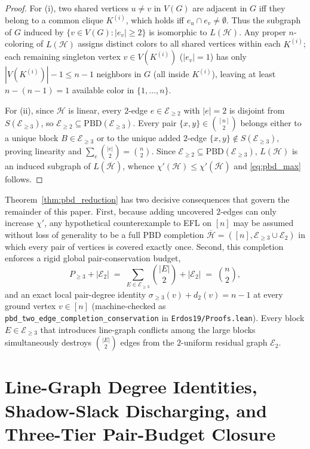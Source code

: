\documentclass[11pt,reqno]{amsart}
\theoremstyle{definition}
\theoremstyle{remark}
\begin{document}
\begin{proof}
For (i), two shared vertices $u \ne v$ in $V(G)$ are adjacent in $G$ iff they belong to a common clique $K^{(i)}$, which holds iff $e_u \cap e_v \ne \emptyset$. Thus the subgraph of $G$ induced by $\{v \in V(G) : |e_v| \ge 2\}$ is isomorphic to $L(\mathcal{H})$. Any proper $n$-coloring of $L(\mathcal{H})$ assigns distinct colors to all shared vertices within each $K^{(i)}$; each remaining singleton vertex $v \in V(K^{(i)})$ ($|e_v| = 1$) has only $|V(K^{(i)})| - 1 \le n - 1$ neighbors in $G$ (all inside $K^{(i)}$), leaving at least $n - (n - 1) = 1$ available color in $\{1, \dots, n\}$.

For (ii), since $\mathcal{H}$ is linear, every $2$-edge $e \in \mathcal{E}_{\ge 2}$ with $|e| = 2$ is disjoint from $S(\mathcal{E}_{\ge 3})$, so $\mathcal{E}_{\ge 2} \subseteq \mathrm{PBD}(\mathcal{E}_{\ge 3})$. Every pair $\{x, y\} \in \binom{[n]}{2}$ belongs either to a unique block $B \in \mathcal{E}_{\ge 3}$ or to the unique added $2$-edge $\{x, y\} \notin S(\mathcal{E}_{\ge 3})$, proving linearity and $\sum_{e} \binom{|e|}{2} = \binom{n}{2}$. Since $\mathcal{E}_{\ge 2} \subseteq \mathrm{PBD}(\mathcal{E}_{\ge 3})$, $L(\mathcal{H})$ is an induced subgraph of $L(\overline{\mathcal{H}})$, whence $\chi'(\mathcal{H}) \le \chi'(\overline{\mathcal{H}})$ and \eqref{eq:pbd_max} follows.
\end{proof}

Theorem~\ref{thm:pbd_reduction} has two decisive consequences that govern the remainder of this paper. First, because adding uncovered $2$-edges can only increase $\chi'$, any hypothetical counterexample to EFL on $[n]$ may be assumed without loss of generality to be a full PBD completion $\overline{\mathcal{H}} = ([n], \mathcal{E}_{\ge 3} \cup \mathcal{E}_2)$ in which every pair of vertices is covered exactly once. Second, this completion enforces a rigid global pair-conservation budget,
\[
  P_{\ge 3} + |\mathcal{E}_2| \;=\; \sum_{E \in \mathcal{E}_{\ge 3}} \binom{|E|}{2} + |\mathcal{E}_2| \;=\; \binom{n}{2},
\]
and an exact local pair-degree identity $\sigma_{\ge 3}(v) + d_2(v) = n - 1$ at every ground vertex $v \in [n]$ (machine-checked as \texttt{pbd\_two\_edge\_completion\_conservation} in \texttt{Erdos19/Proofs.lean}). Every block $E \in \mathcal{E}_{\ge 3}$ that introduces line-graph conflicts among the large blocks simultaneously destroys $\binom{|E|}{2}$ edges from the $2$-uniform residual graph $\mathcal{E}_2$.

\section{Line-Graph Degree Identities, Shadow-Slack Discharging, and Three-Tier Pair-Budget Closure}
\end{document}
